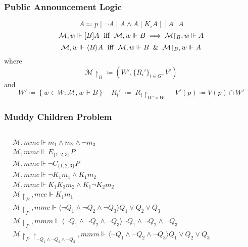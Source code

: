 \documentclass[UTF8,11pt,colorlinks,compress,openany]{beamer}%
\begin{document}
\begin{frame}\frametitle{Public Announcement Logic}
\[A\Coloneqq p\mid \neg A\mid A\wedge A\mid K_i A\mid [A]A\]
\[\mathcal{M},w\Vdash[B]A \mbox{\; iff \;} \mathcal{M},w\Vdash B\implies\mathcal{M}{\restriction_B},w\Vdash A\]
\[\mathcal{M},w\Vdash\langle B\rangle A \mbox{\; iff \;} \mathcal{M},w\Vdash B\;\;\&\;\;\mathcal{M}{\restriction_B},w\Vdash A\]
where
\[\mathcal{M}{\restriction_B}\coloneqq \left(W',\{R_i'\}_{i\in G},V'\right)\] and 
\[W'\coloneqq \left\{w\in W: \mathcal{M},w\Vdash B\right\}\quad R_i'\;\coloneqq \;R_i\!{\restriction_{W'\times W'}} \quad V'(p)\coloneqq V(p)\cap W'\]
\end{frame}

\begin{frame}\frametitle{Muddy Children Problem}\vspace*{-10pt}
\begin{columns}
\column{\textwidth}
\begin{align*}
&\mathcal{M},mmc\Vdash m_1\wedge m_2\wedge\neg m_3\\
&\mathcal{M},mmc\Vdash E_{\{1,2,3\}} P\\
&\mathcal{M},mmc\Vdash \neg C_{\{1,2,3\}} P\\
&\mathcal{M},mmc\Vdash \neg K_1m_1\wedge K_1m_2\\
&\mathcal{M},mmc\Vdash K_1K_3m_2\wedge K_1\neg K_2m_2\\
&\mathcal{M}{\restriction_P},mcc\Vdash K_1m_1\\
&\mathcal{M}{\restriction_P},mmc\Vdash\langle \neg Q_1\wedge\neg Q_2\wedge\neg Q_3\rangle Q_1\vee Q_2\vee Q_3\\
&\mathcal{M}{\restriction_P},mmm\Vdash\langle \neg Q_1\wedge\neg Q_2\wedge\neg Q_3\rangle \neg Q_1\wedge\neg Q_2\wedge\neg Q_3\\
&\mathcal{M}{\restriction_P}{\restriction_{\neg Q_1\wedge\neg Q_2\wedge\neg Q_3}},mmm\Vdash\langle \neg Q_1\wedge\neg Q_2\wedge\neg Q_3\rangle Q_1\vee Q_2\vee Q_3
\end{align*}
\vspace{.45\textwidth}\hspace*{-1.7\textwidth}
\end{columns}
\end{frame}
\end{document}
